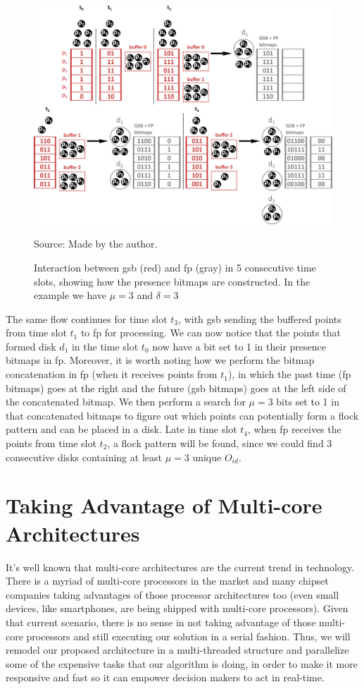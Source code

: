 \begin{figure}[h!]
    \centering
    \caption{Interaction between \ac{gsb} (red) and \ac{fp} (gray) in 5 consecutive time slots, showing how the presence
        bitmaps are constructed. In the example we have $\mu = 3$ and $\delta = 3$}
    \centerline{\includegraphics[width=\linewidth]{images/gsb_fp_flow.eps}}
    \footnotesize{Source: Made by the author.}
    \label{fig:gsb_fp_flow}
\end{figure}

The same flow continues for time slot $t_3$, with \ac{gsb} sending the buffered points from time slot $t_1$ to \ac{fp}
for processing. We can now notice that the points that formed disk $d_1$ in the time slot $t_0$ now have a bit set to 1
in their presence bitmaps in \ac{fp}. Moreover, it is worth noting how we perform the bitmap concatenation in \ac{fp}
(when it receives points from $t_1$), in which the past time (\ac{fp} bitmaps) goes at the right and the future
(\ac{gsb} bitmaps) goes at the left side of the concatenated bitmap. We then perform a search for $\mu = 3$ bits set to
1 in that concatenated bitmaps to figure out which points can potentially form a flock pattern and can be placed in a
disk. Late in time slot $t_4$, when \ac{fp} receives the points from time slot $t_2$, a flock pattern will be found,
since we could find 3 consecutive disks containing at least $\mu = 3$ unique $O_{id}$.

\section{Taking Advantage of Multi-core Architectures}
\label{sec:multithread}
It's well known that multi-core architectures are the current trend in technology. There is a myriad of multi-core
processors in the market and many chipset companies taking advantages of those processor architectures too (even small
devices, like smartphones, are being shipped with multi-core processors). Given that current scenario, there is no sense
in not taking advantage of those multi-core processors and still executing our solution in a serial fashion. Thus, we
will remodel our proposed architecture in a multi-threaded structure and parallelize some of the expensive tasks that
our algorithm is doing, in order to make it more responsive and fast so it can empower decision makers to act in
real-time.

